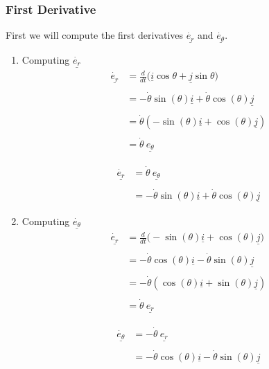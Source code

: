 \subsubsection{First Derivative}
First we will compute the first derivatives $\underline{\dot{e_{r}}}$ and $\underline{\dot{e_{\theta}}}$.
\begin{enumerate}
	\item Computing $\underline{\dot{e_r}}$
	      $$\begin{aligned} \underline{\dot{e_{r}}} & = \frac{d}{dt}\Big(\underline{i}\cos\theta  + \underline{j}\sin\theta\Big)         \\ \\
                                        & = - \dot{\theta}\sin(\theta) \underline{i} + \dot{\theta}\cos(\theta)\underline{j} \\ \\
                                        & = \dot{\theta}(-\sin(\theta)\underline{i} + \cos(\theta)\underline{j})             \\ \\
                                        & = \dot{\theta}\ \underline{e_{\theta}}\end{aligned}$$
	      \begin{definition}
		      $$\begin{aligned} \underline{\dot{e_{r}}} &= \dot{\theta}\ \underline{e_{\theta}}\\ \\ &= - \dot{\theta}\sin(\theta) \underline{i} + \dot{\theta}\cos(\theta)\underline{j} \end{aligned}$$
	      \end{definition}

	      \clearpage
	\item Computing $\underline{\dot{e_{\theta}}}$
	      $$\begin{aligned} \underline{\dot{e_{r}}} & = \frac{d}{dt}\Big(-\sin(\theta)\underline{i}  + \cos(\theta)\underline{j}\Big)    \\ \\
                                        & = - \dot{\theta}\cos(\theta) \underline{i} - \dot{\theta}\sin(\theta)\underline{j} \\ \\
                                        & = -\dot{\theta}(\cos(\theta)\underline{i} + \sin(\theta)\underline{j})             \\ \\
                                        & = \dot{\theta}\ \underline{e_{r}}\end{aligned}$$

	      \begin{definition}
		      $$\begin{aligned} \underline{\dot{e_{\theta}}} &= -\dot{\theta}\ \underline{e_{r}}\\ \\ &= - \dot{\theta}\cos(\theta) \underline{i} - \dot{\theta}\sin(\theta)\underline{j} \end{aligned}$$
	      \end{definition}
\end{enumerate}
